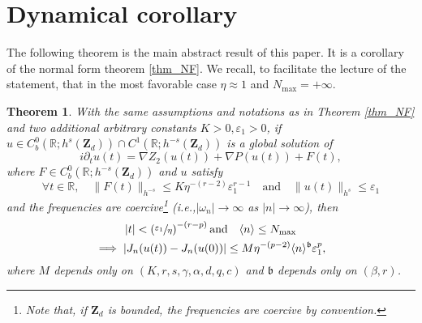 \documentclass[11pt]{article}
\newcommand{\ie}{i.e.,\xspace}
\newtheorem{theorem}{Theorem}[section]
\theoremstyle{definition}
\begin{document}
\section{Dynamical corollary}
\label{sec_dyn_co}

The following theorem is the main abstract result of this paper. It is a corollary of the normal form theorem \ref{thm_NF}. We recall, to facilitate the lecture of the statement, that in the most favorable case $\eta\approx 1$ and $N_{\max}= +\infty$.
\begin{theorem}
\label{thm_main_dyn} With the same assumptions and notations as in Theorem \ref{thm_NF} and two additional arbitrary constants $K>0,\varepsilon_1>0$, if $u\in C^0_b(\mathbb{R};h^s(\mathbf{Z}_d))\cap C^1(\mathbb{R};h^{-s}(\mathbf{Z}_d))$ is a global solution of
\begin{equation}
\label{eq_non_auto}
i\partial_t u(t) = \nabla Z_2(u(t)) + \nabla P(u(t)) + F(t),
\end{equation}
where $F\in C^0_b(\mathbb{R};h^{-s}(\mathbf{Z}_d))$ and $u$ satisfy
\[
\forall t\in \mathbb{R}, \quad \| F(t) \|_{h^{-s}} \leq K \eta^{-(r-2)}\varepsilon_1^{r-1} \quad \text{and} \quad \| u(t) \|_{h^s} \leq \varepsilon_1
\]
and the frequencies are coercive\footnote{Note that, if $\mathbf{Z}_d$ is bounded, the frequencies are coercive by convention.} (\ie $|\omega_n| \to \infty$ as $|n| \to \infty$),
then
\begin{multline}
\label{eq_Willy}
|t|< \left(\sfrac{\varepsilon_1 }{\eta} \right)^{-(r-p)} \text{and} \quad \langle n \rangle \leq N_{\max} \\ \implies |J_n(u(t))-J_n(u(0))|\leq M \eta ^{-(p-2)} \langle n \rangle^{\mathfrak{b}} \varepsilon_1^{p},
\end{multline}
where $M$ depends only on $(K,r,s,\gamma,\alpha,d,q,c)$ and $\mathfrak{b}$ depends only on $(\beta,r)$.
\end{theorem}
\end{document}
